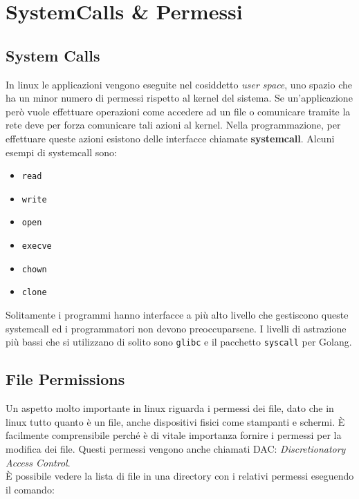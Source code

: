 \chapter{SystemCalls \& Permessi}

\section{System Calls}

In linux le applicazioni vengono eseguite nel cosiddetto \textit{user space},
uno spazio che ha un minor numero di permessi rispetto al kernel del sistema.
Se un'applicazione però vuole effettuare operazioni come accedere ad un file
o comunicare tramite la rete deve per forza comunicare tali azioni al kernel.
Nella programmazione, per effettuare queste azioni esistono delle interfacce
chiamate \textbf{systemcall}. Alcuni esempi di systemcall sono:

\begin{itemize}
    \item \verb|read|
    \item \verb|write|
    \item \verb|open|
    \item \verb|execve|
    \item \verb|chown|
    \item \verb|clone|
\end{itemize}

Solitamente i programmi hanno interfacce a più alto livello che gestiscono queste
systemcall ed i programmatori non devono preoccuparsene. I livelli di astrazione
più bassi che si utilizzano di solito sono \verb|glibc| e il pacchetto
\verb|syscall| per Golang.

\section{File Permissions}

Un aspetto molto importante in linux riguarda i permessi dei file, dato che in
linux tutto quanto è un file, anche dispositivi fisici come stampanti e schermi.
È facilmente comprensibile perché è di vitale importanza fornire i permessi per
la modifica dei file. Questi permessi vengono anche chiamati DAC:
\textit{Discretionatory Access Control}.\\ %

È possibile vedere la lista di file in una directory con i relativi permessi
eseguendo il comando:

